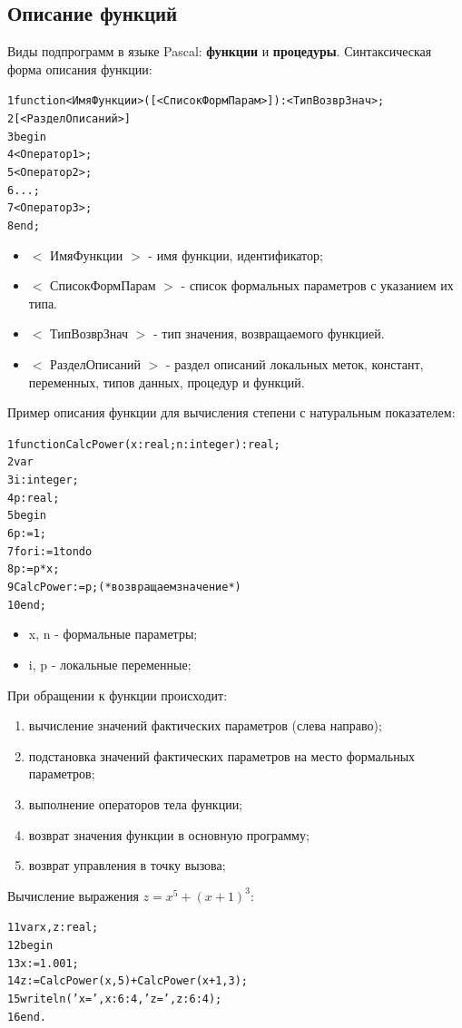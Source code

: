 \documentclass{beamer}
\begin{document}
\subsection{Описание функций}
\begin{frame}[fragile]
Виды подпрограмм в языке Pascal: \textbf{функции} и \textbf{процедуры}. Синтаксическая форма описания функции:
\begin{alltt}
1 function <ИмяФункции>([<СписокФормПарам>]):<ТипВозврЗнач>;
2     [<РазделОписаний>]
3 begin
4   <Оператор1>;
5   <Оператор2>;
6   ...;
7   <Оператор3>;
8 end;
\end{alltt}
\begin{itemize}
\item $<$ ИмяФункции $>$ - имя функции, идентификатор;
\item $<$ СписокФормПарам $>$ - список формальных параметров с указанием их типа.
\item $<$ ТипВозврЗнач $>$ - тип значения, возвращаемого функцией.
\item $<$ РазделОписаний $>$ - раздел описаний локальных меток, констант, переменных, типов данных, процедур и функций.
\end{itemize}
\end{frame}

\begin{frame}[fragile]
Пример описания функции для вычисления степени с натуральным показателем:
\begin{alltt}
1 function CalcPower(x: real; n: integer):real;
2 var 
3   i: integer;
4   p: real;
5 begin
6   p := 1;
7   for i := 1 to n do 
8       p := p * x;
9   CalcPower := p; (*возвращаем значение*)
10 end;
\end{alltt}
\begin{itemize}
\item x, n - формальные параметры;
\item i, p - локальные переменные;
\end{itemize}
\end{frame}

\begin{frame}[fragile]
При обращении к функции происходит:
\begin{enumerate}
\item вычисление значений фактических параметров (слева направо);
\item подстановка значений фактических параметров на место формальных параметров;
\item выполнение операторов тела функции;
\item возврат значения функции в основную программу;
\item возврат управления в точку вызова;
\end{enumerate}
Вычисление выражения $z = x^{5} + (x+1)^{3}$:
\begin{alltt}
11 var x, z: real; 
12 begin
13   x := 1.001;
14   z := CalcPower(x, 5) + CalcPower(x+1, 3);
15   writeln('x=', x:6:4, 'z=', z:6:4);
16 end.
\end{alltt}
\end{frame}
\end{document}
